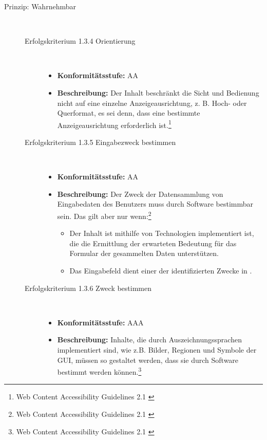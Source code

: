 \begin{description}
	\item[Prinzip: Wahrnehmbar]\hfill \\
	\begin{description}
		\item [Erfolgskriterium 1.3.4 Orientierung]\hfill \\
		\begin{itemize}
			\item \textbf{Konformitätsstufe:} AA
			\item \textbf{Beschreibung:} Der Inhalt beschränkt die Sicht und Bedienung nicht auf eine einzelne Anzeigeausrichtung, z. B. Hoch- oder Querformat, es sei
			 denn, dass eine bestimmte Anzeigeausrichtung erforderlich ist.\footnote{Web Content Accessibility Guidelines 2.1 \cite{WCAG2.1}}
		\end{itemize}
		
		\item [Erfolgskriterium 1.3.5 Eingabezweck bestimmen]\hfill \\
		\begin{itemize}
			\item \textbf{Konformitätsstufe:} AA
			\item \textbf{Beschreibung:} Der Zweck der Datensammlung von Eingabedaten des Benutzers muss durch Software bestimmbar sein. Das gilt aber nur 
			wenn:\footnote{Web Content Accessibility Guidelines 2.1 \cite{WCAG2.1}}
			\begin{itemize}
				\item Der Inhalt ist mithilfe von Technologien implementiert ist, die die Ermittlung der erwarteten Bedeutung für das Formular der gesammelten Daten unterstützen.
				\item Das Eingabefeld dient einer der identifizierten Zwecke in .
			\end{itemize}
		\end{itemize}
		
		\item [Erfolgskriterium 1.3.6 Zweck bestimmen]\hfill \\
		\begin{itemize}
			\item \textbf{Konformitätsstufe:} AAA
			\item \textbf{Beschreibung:} Inhalte, die durch Auszeichnungssprachen implementiert sind, wie z.B. Bilder, Regionen und Symbole der \ac{GUI}, müssen 
			so gestaltet werden, dass sie durch Software bestimmt werden können.\footnote{Web Content Accessibility Guidelines 2.1 \cite{WCAG2.1}}
		\end{itemize}
		

\end{description}
\end{description}
